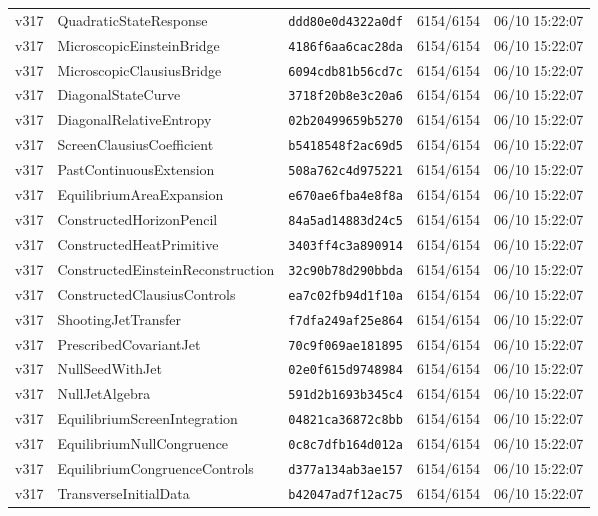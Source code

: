 \documentclass[11pt]{article}
\theoremstyle{definition}\newtheorem{deriv}{Derivation}
\begin{document}
{\begin{longtable}{@{}lllll@{}}
v317 & QuadraticStateResponse & \texttt{ddd80e0d4322a0df} & 6154/6154 & 06/10 15:22:07 \\
v317 & MicroscopicEinsteinBridge & \texttt{4186f6aa6cac28da} & 6154/6154 & 06/10 15:22:07 \\
v317 & MicroscopicClausiusBridge & \texttt{6094cdb81b56cd7c} & 6154/6154 & 06/10 15:22:07 \\
v317 & DiagonalStateCurve & \texttt{3718f20b8e3c20a6} & 6154/6154 & 06/10 15:22:07 \\
v317 & DiagonalRelativeEntropy & \texttt{02b20499659b5270} & 6154/6154 & 06/10 15:22:07 \\
v317 & ScreenClausiusCoefficient & \texttt{b5418548f2ac69d5} & 6154/6154 & 06/10 15:22:07 \\
v317 & PastContinuousExtension & \texttt{508a762c4d975221} & 6154/6154 & 06/10 15:22:07 \\
v317 & EquilibriumAreaExpansion & \texttt{e670ae6fba4e8f8a} & 6154/6154 & 06/10 15:22:07 \\
v317 & ConstructedHorizonPencil & \texttt{84a5ad14883d24c5} & 6154/6154 & 06/10 15:22:07 \\
v317 & ConstructedHeatPrimitive & \texttt{3403ff4c3a890914} & 6154/6154 & 06/10 15:22:07 \\
v317 & ConstructedEinsteinReconstruction & \texttt{32c90b78d290bbda} & 6154/6154 & 06/10 15:22:07 \\
v317 & ConstructedClausiusControls & \texttt{ea7c02fb94d1f10a} & 6154/6154 & 06/10 15:22:07 \\
v317 & ShootingJetTransfer & \texttt{f7dfa249af25e864} & 6154/6154 & 06/10 15:22:07 \\
v317 & PrescribedCovariantJet & \texttt{70c9f069ae181895} & 6154/6154 & 06/10 15:22:07 \\
v317 & NullSeedWithJet & \texttt{02e0f615d9748984} & 6154/6154 & 06/10 15:22:07 \\
v317 & NullJetAlgebra & \texttt{591d2b1693b345c4} & 6154/6154 & 06/10 15:22:07 \\
v317 & EquilibriumScreenIntegration & \texttt{04821ca36872c8bb} & 6154/6154 & 06/10 15:22:07 \\
v317 & EquilibriumNullCongruence & \texttt{0c8c7dfb164d012a} & 6154/6154 & 06/10 15:22:07 \\
v317 & EquilibriumCongruenceControls & \texttt{d377a134ab3ae157} & 6154/6154 & 06/10 15:22:07 \\
v317 & TransverseInitialData & \texttt{b42047ad7f12ac75} & 6154/6154 & 06/10 15:22:07 \\

\end{longtable}}
\end{document}
